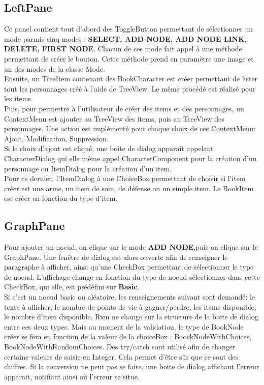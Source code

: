 		\subsection{LeftPane}
			Ce panel contient tout d'abord des ToggleButton permettant de sélectionner un mode parmis cinq modes : \textbf{SELECT, ADD NODE, ADD NODE LINK, DELETE, FIRST NODE}. Chacun de ces mode fait appel à une méthode permettant de créer le bouton. Cette méthode prend en paramètre une image et un des modes de la classe Mode.\\
			Ensuite, un TreeItem contenant des BookCharacter est créer permettant de lister tout les personnages créé à l'aide de TreeView. Le même procédé est réalisé pour les items.\\
			Puis, pour permettre à l'utilisateur de créer des items et des personnages, un ContextMenu est ajouter au TreeView des items, puis au TreeView des personnages. Une action est implémenté pour chaque choix de ces ContextMenu: Ajout, Modification, Suppression.\\
			Si le choix d'ajout est cliqué, une boite de dialog apparait appelant CharacterDialog qui elle même appel CharacterComponent pour la création d'un personnage ou ItemDialog pour la création d'un item.\\
			Pour ce dernier, l'ItemDialog à une ChoiceBox permettant de choisir si l'item créer est une arme, un item de soin, de défense ou un simple item. Le BookItem est créer en fonction du type d'item.\\


		\subsection{GraphPane}
		Pour ajouter un noeud, on clique sur le mode \textbf{ADD NODE},puis on clique sur le GraphPane. Une fenêtre de dialog est alors ouverte afin de renseigner le paragraphe à afficher, ainsi qu'une CheckBox permettant de sélectionner le type de noeud. L'affichage change en fonction du type de noeud sélectionner dans cette CheckBox, qui elle, est prédéfini sur \textbf{Basic}.\\

		Si c'est un noeud basic ou aléatoire, les renseignements suivant sont demandé: le texte à afficher, le nombre de points de vie à gagner/perdre, les items disponible, le nombre d'item disponible. Rien ne change sur la structure de la boite de dialog entre ces deux types. Mais au moment de la validation, le type de BookNode créer se fera en fonction de la valeur de la choiceBox : BoockNodeWithChoices, BookNodeWithRandomChoices. Des try/catch sont utilisé afin de changer certaine valeurs de saisie en Integer. Cela permet d'être sûr que ce sont des chiffres. Si la conversion ne peut pas se faire, une boite de dialog affichant l'erreur apparait, notifiant ainsi où l'erreur se situe.\\


